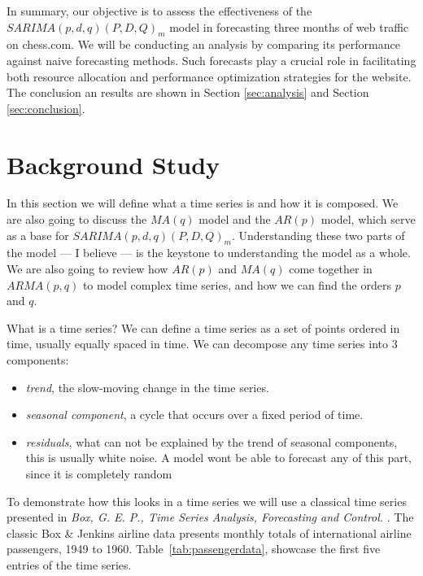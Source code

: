 \documentclass[journal]{IEEEtran}
\begin{document}
In summary, our objective is to assess the effectiveness of the
$SARIMA(p,d,q)(P,D,Q)_m$ model in forecasting three months of web traffic on
chess.com. We will be conducting an analysis by comparing its performance
against naive forecasting methods. Such forecasts play a crucial role in
facilitating both resource allocation and performance optimization strategies
for the website. The conclusion an results are shown in Section
\ref{sec:analysis} and Section \ref{sec:conclusion}.


\section{Background Study}\label{sec:back}
In this section we will define what a time series is and how it is composed.
We are also going to discuss the $MA(q)$ model and the $AR(p)$ model, which
serve as a base for $SARIMA(p,d,q)(P,D,Q)_m$. Understanding these two parts
of the model --- I believe --- is the keystone to understanding the model as a
whole. We are also going to review how $AR(p)$ and $MA(q)$ come together in
$ARMA(p,q)$ to model complex time series, and how we can find the orders $p$
and $q$.

What is a time series? We can define a time series as a set of points ordered
in time, usually equally spaced in time. \cite{timeseries} We can decompose
any time series into 3 components:

\begin{itemize}
    \item \emph{trend}, the slow-moving change in the time series.

    \item \emph{seasonal component}, a cycle that occurs over a fixed period
        of time.

    \item \emph{residuals}, what can not be explained by the trend of seasonal
        components, this is usually white noise. A model wont be able to
        forecast any of this part, since it is completely random
\end{itemize}

To demonstrate how this looks in a time series we will use a classical time
series presented in \emph{Box, G. E. P., Time Series Analysis, Forecasting and
Control.} \cite{airline}. The classic Box \& Jenkins airline data presents
monthly totals of international airline passengers, 1949 to 1960.
Table~\ref{tab:passengerdata}, showcase the first five entries of the time
series.
\end{document}
